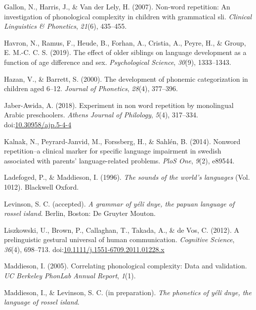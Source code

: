 \documentclass[english,,man,floatsintext]{apa6}
\begin{document}
\hypertarget{ref-gallon2007non}{}
Gallon, N., Harris, J., \& Van der Lely, H. (2007). Non-word repetition:
An investigation of phonological complexity in children with grammatical
sli. \emph{Clinical Linguistics \& Phonetics}, \emph{21}(6), 435--455.

\hypertarget{ref-havron2019effect}{}
Havron, N., Ramus, F., Heude, B., Forhan, A., Cristia, A., Peyre, H., \&
Group, E. M.-C. C. S. (2019). The effect of older siblings on language
development as a function of age difference and sex. \emph{Psychological
Science}, \emph{30}(9), 1333--1343.

\hypertarget{ref-hazan2000development}{}
Hazan, V., \& Barrett, S. (2000). The development of phonemic
categorization in children aged 6--12. \emph{Journal of Phonetics},
\emph{28}(4), 377--396.

\hypertarget{ref-jabere2018xperiment}{}
Jaber-Awida, A. (2018). Experiment in non word repetition by monolingual
Arabic preschoolers. \emph{Athens Journal of Philology}, \emph{5}(4),
317--334.
doi:\href{https://doi.org/10.30958/ajp.5-4-4}{10.30958/ajp.5-4-4}

\hypertarget{ref-kalnak2014nonword}{}
Kalnak, N., Peyrard-Janvid, M., Forssberg, H., \& Sahlén, B. (2014).
Nonword repetition--a clinical marker for specific language impairment
in swedish associated with parents' language-related problems.
\emph{PloS One}, \emph{9}(2), e89544.

\hypertarget{ref-ladefoged1996sounds}{}
Ladefoged, P., \& Maddieson, I. (1996). \emph{The sounds of the world's
languages} (Vol. 1012). Blackwell Oxford.

\hypertarget{ref-levinsonYDgrammar}{}
Levinson, S. C. (accepted). \emph{A grammar of yélî dnye, the papuan
language of rossel island}. Berlin, Boston: De Gruyter Mouton.

\hypertarget{ref-liszkowski2012prelinguistic}{}
Liszkowski, U., Brown, P., Callaghan, T., Takada, A., \& de Vos, C.
(2012). A prelinguistic gestural universal of human communication.
\emph{Cognitive Science}, \emph{36}(4), 698--713.
doi:\href{https://doi.org/10.1111/j.1551-6709.2011.01228.x}{10.1111/j.1551-6709.2011.01228.x}

\hypertarget{ref-maddieson2005correlating}{}
Maddieson, I. (2005). Correlating phonological complexity: Data and
validation. \emph{UC Berkeley PhonLab Annual Report}, \emph{1}(1).

\hypertarget{ref-maddiesonIPphoneticsYD}{}
Maddieson, I., \& Levinson, S. C. (in preparation). \emph{The phonetics
of yélî dnye, the language of rossel island}.
\end{document}
